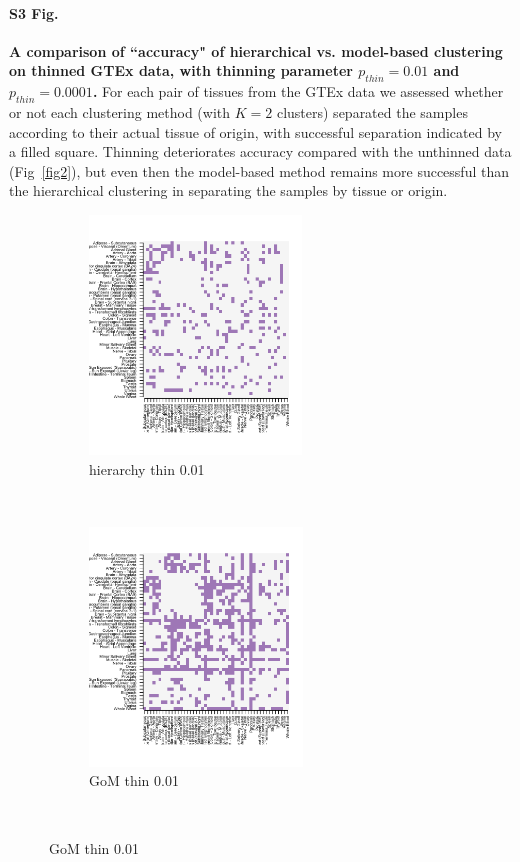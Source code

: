 \documentclass[10pt,letterpaper]{article}
\begin{document}
\paragraph*{S3 Fig.}
\label{figS2}
{\bf A comparison of ``accuracy" of hierarchical vs. model-based clustering on thinned GTEx data, with thinning parameter $p_{thin}=0.01$ and $p_{thin}=0.0001$.}  For each pair of tissues from the GTEx data we assessed whether or not each clustering method (with $K=2$ clusters) separated the samples according to their actual tissue of origin, with successful separation indicated by a filled square. Thinning deteriorates accuracy compared with the unthinned data (Fig~\ref{fig2}), but even then the model-based method remains more successful than the hierarchical clustering in separating the samples by tissue or origin.
 \begin{figure}[ht]
    \centering    
     \begin{subfigure}[t]{0.5\textwidth}
        \centering
        \includegraphics[height=2.5in]{../plots/rsz_1hierarchy_F_thin_0_01.png}
        \caption{hierarchy thin 0.01}
    \end{subfigure}%
    ~
    \begin{subfigure}[t]{0.5\textwidth}
        \centering
        \includegraphics[height=2.5in]{../plots/rsz_1admixture_F_thin_0_01.png}
        \caption{GoM thin 0.01}
    \end{subfigure}\\
    

\end{figure}
\end{document}
